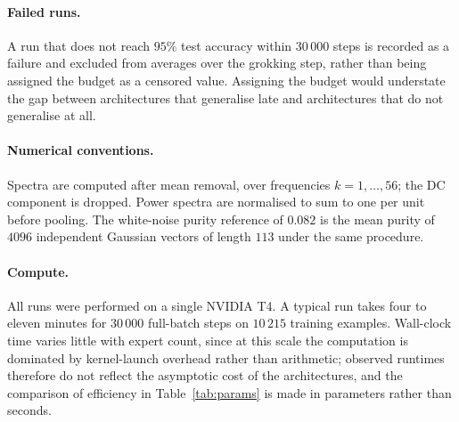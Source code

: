 \paragraph{Failed runs.} A run that does not reach $95\%$ test accuracy within
$30\,000$ steps is recorded as a failure and excluded from averages over the
grokking step, rather than being assigned the budget as a censored value.
Assigning the budget would understate the gap between architectures that
generalise late and architectures that do not generalise at all.

\paragraph{Numerical conventions.} Spectra are computed after mean removal,
over frequencies $k = 1, \ldots, 56$; the DC component is dropped. Power
spectra are normalised to sum to one per unit before pooling. The white-noise
purity reference of $0.082$ is the mean purity of $4096$ independent Gaussian
vectors of length $113$ under the same procedure.

\paragraph{Compute.} All runs were performed on a single NVIDIA T4. A typical
run takes four to eleven minutes for $30\,000$ full-batch steps on $10\,215$
training examples. Wall-clock time varies little with expert count, since at
this scale the computation is dominated by kernel-launch overhead rather than
arithmetic; observed runtimes therefore do not reflect the asymptotic cost of
the architectures, and the comparison of efficiency in
Table~\ref{tab:params} is made in parameters rather than seconds.